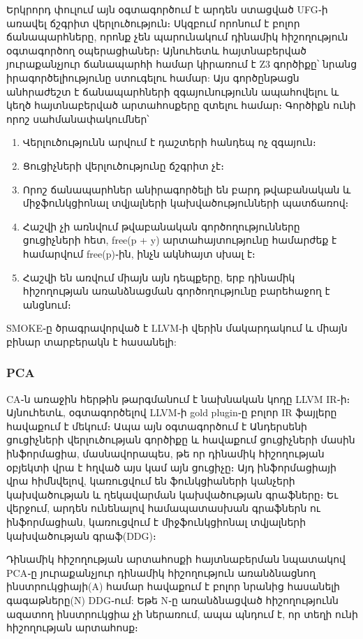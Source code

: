 {        Երկրորդ փուլում այն օգտագործում է արդեն ստացված UFG֊ի առավել ճշգրիտ վերլուծություն։ Սկզբում որոնում է բոլոր
        ճանապարհները, որոնք չեն պարունակում դինամիկ հիշողություն օգտագործող օպերացիաներ։ Այնուհետև հայտնաբերված յուրաքանչյուր
        ճանապարհի համար կիրառում է Z3 գործիքը\cite{Z3}՝ նրանց իրագործելիությունը ստուգելու համար: Այս գործընթացն անհրաժեշտ է
        ճանապարհների զգայունությունն ապահովելու և կեղծ հայտնաբերված արտահոսքերը զտելու համար։ Գործիքն ունի որոշ սահմանափակումներ՝
        \begin{enumerate}[itemsep=1mm]
            \item Վերլուծությունն արվում է դաշտերի հանդեպ ոչ զգայուն։
            \item Ցուցիչների վերլուծությունը ճշգրիտ չէ։
            \item Որոշ ճանապարհներ անիրագործելի են բարդ թվաբանական և միջֆունկցիոնալ տվյալների կախվածությունների պատճառով։
            \item Հաշվի չի առնվում թվաբանական գործողությունները ցուցիչների հետ, free(p + y) արտահայտությունը համարժեք է համարվում free(p)֊ին, ինչն ակնհայտ սխալ է։
            \item Հաշվի են առվում միայն այն դեպքերը, երբ դինամիկ հիշողության առանձնացման գործողությունը բարեհաջող է անցնում։
        \end{enumerate}

        SMOKE֊ը ծրագրավորված է LLVM-ի վերին մակարդակում և միայն բինար տարբերակն է հասանելի\cite{SMOKE}:

        \subsubsection{PCA}
        CA\cite{Li2020}֊ն առաջին հերթին թարգմանում է նախնական կոդը LLVM IR֊ի։ Այնուհետև, օգտագործելով LLVM֊ի gold plugin֊ը
        բոլոր IR ֆայլերը հավաքում է մեկում։ Ապա այն օգտագործում է Անդերսենի ցուցիչների վերլուծության գործիքը\cite{Andersen}
        և հավաքում ցուցիչների մասին ինֆորմացիա, մասնավորապես, թե որ դինամիկ հիշողության օբյեկտի վրա է հղված այս կամ այն ցուցիչը։
        Այդ ինֆորմացիայի վրա հիմնվելով, կառուցվում են ֆունկցիաների կանչերի կախվածության և ղեկավարման կախվածության գրաֆները։
        Եւ վերջում, արդեն ունենալով համապատասխան գրաֆներն ու ինֆորմացիան, կառուցվում է միջֆունկցիոնալ տվյալների կախվածության գրաֆ(DDG)։

        Դինամիկ հիշողության արտահոսքի հայտնաբերման նպատակով PCA֊ը յուրաքանչյուր դինամիկ հիշողություն առանձնացնող ինստրուկցիայի(A)
        համար հավաքում է բոլոր նրանից հասանելի գագաթները(N) DDG֊ում: Եթե N֊ը առանձնացված հիշողությունն ազատող ինստրուկցիա
        չի ներառում, ապա պնդում է, որ տեղի ունի հիշողության արտահոսք։

}

